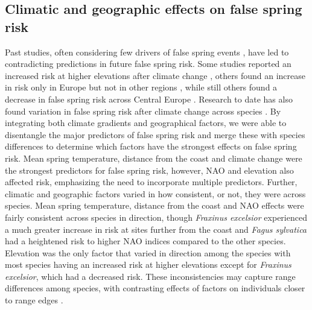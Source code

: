 \documentclass{article}\usepackage[]{graphicx}\usepackage[]{color}
\begin{document}
\subsection*{Climatic and geographic effects on false spring risk}
Past studies, often considering few drivers of false spring events \citep{Liu2018,  Vitasse2018, Ma2018, Wypych2016a}, have led to contradicting predictions in future false spring risk. Some studies reported an increased risk at higher elevations after climate change \citep{Vitasse2018}, others found an increase in risk only in Europe but not in other regions \citep{Liu2018}, while still others found a decrease in false spring risk across Central Europe \citep{Wypych2016a}. Research to date has also found variation in false spring risk after climate change across species \citep{Ma2018}. By integrating both climate gradients and geographical factors, we were able to disentangle the major predictors of false spring risk and merge these with species differences to determine which factors have the strongest effects on false spring risk. Mean spring temperature, distance from the coast and climate change were the strongest predictors for false spring risk, however, NAO and elevation also affected risk, emphasizing the need to incorporate multiple predictors. Further, climatic and geographic factors varied in how consistent, or not, they were across species. Mean spring temperature, distance from the coast and NAO effects were fairly consistent across species in direction, though \textit{Fraxinus excelsior} experienced a much greater increase in risk at sites further from the coast and \textit{Fagus sylvatica} had a heightened risk to higher NAO indices compared to the other species. Elevation was the only factor that varied in direction among the species with most species having an increased risk at higher elevations except for \textit{Fraxinus excelsior}, which had a decreased risk. These inconsistencies may capture range differences among species, with contrasting effects of factors on individuals closer to range edges \citep{Chuine2008}. 
\end{document}
